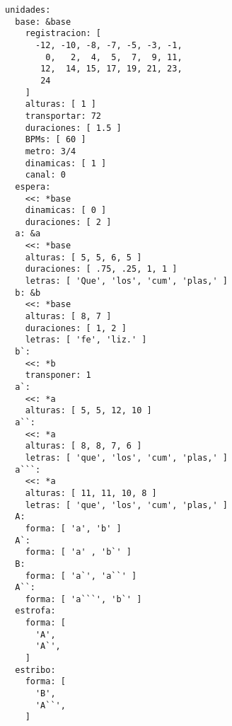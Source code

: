 \begin{itemize}
\begin{verbatim}
unidades: 
  base: &base 
    registracion: [ 
      -12, -10, -8, -7, -5, -3, -1,
        0,   2,  4,  5,  7,  9, 11,
       12,  14, 15, 17, 19, 21, 23,
       24
    ]
    alturas: [ 1 ] 
    transportar: 72 
    duraciones: [ 1.5 ]
    BPMs: [ 60 ]
    metro: 3/4
    dinamicas: [ 1 ]
    canal: 0
  espera:
    <<: *base
    dinamicas: [ 0 ] 
    duraciones: [ 2 ]
  a: &a 
    <<: *base
    alturas: [ 5, 5, 6, 5 ] 
    duraciones: [ .75, .25, 1, 1 ]
    letras: [ 'Que', 'los', 'cum', 'plas,' ]
  b: &b 
    <<: *base
    alturas: [ 8, 7 ] 
    duraciones: [ 1, 2 ]
    letras: [ 'fe', 'liz.' ]
  b`: 
    <<: *b
    transponer: 1
  a`: 
    <<: *a
    alturas: [ 5, 5, 12, 10 ] 
  a``: 
    <<: *a
    alturas: [ 8, 8, 7, 6 ] 
    letras: [ 'que', 'los', 'cum', 'plas,' ]
  a```: 
    <<: *a
    alturas: [ 11, 11, 10, 8 ] 
    letras: [ 'que', 'los', 'cum', 'plas,' ]
  A: 
    forma: [ 'a', 'b' ] 
  A`: 
    forma: [ 'a' , 'b`' ]
  B: 
    forma: [ 'a`', 'a``' ] 
  A``: 
    forma: [ 'a```', 'b`' ] 
  estrofa: 
    forma: [
      'A',
      'A`',
    ]
  estribo: 
    forma: [
      'B',
      'A``',
    ]

\end{verbatim}


\end{itemize}
\setlength{\parskip}{6pt plus 2pt minus 1pt}